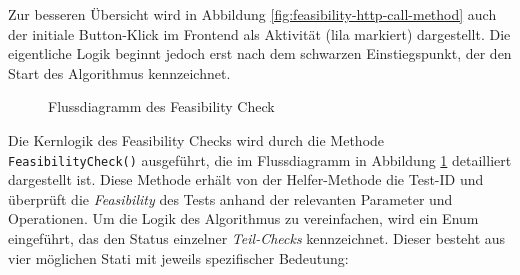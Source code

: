 Zur besseren Übersicht wird in Abbildung \ref{fig:feasibility-http-call-method} auch der initiale Button-Klick im Frontend als Aktivität (lila markiert) dargestellt. Die eigentliche Logik beginnt jedoch erst nach dem schwarzen Einstiegspunkt, der den Start des Algorithmus kennzeichnet.

\begin{figure}[!htbp]
    \centering
    \caption{Flussdiagramm des Feasibility Check}
    \label{fig:feasibility-check}
\end{figure}

Die Kernlogik des Feasibility Checks wird durch die Methode \texttt{FeasibilityCheck()} ausgeführt, die im Flussdiagramm in Abbildung \ref{fig:feasibility-check} detailliert dargestellt ist. Diese Methode erhält von der Helfer-Methode die Test-ID und überprüft die \textit{Feasibility} des Tests anhand der relevanten Parameter und Operationen. Um die Logik des Algorithmus zu vereinfachen, wird ein Enum eingeführt, das den Status einzelner \textit{Teil-Checks} kennzeichnet. Dieser besteht aus vier möglichen Stati mit jeweils spezifischer Bedeutung:

